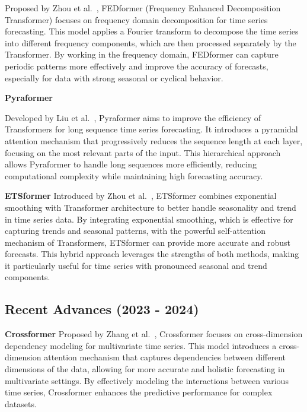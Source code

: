 \noindent Proposed by Zhou et al.~\cite{zhou2022fedformerfrequencyenhanceddecomposed}, FEDformer (Frequency Enhanced Decomposition Transformer) focuses on frequency domain decomposition for time series forecasting. This model applies a Fourier transform to decompose the time series into different frequency components, which are then processed separately by the Transformer. By working in the frequency domain, FEDformer can capture periodic patterns more effectively and improve the accuracy of forecasts, especially for data with strong seasonal or cyclical behavior.
\vspace{10pt}


\noindent\textbf
{Pyraformer}

\noindent Developed by Liu et al.~\cite{liu2022pyraformer}, Pyraformer aims to improve the efficiency of Transformers for long sequence time series forecasting. It introduces a pyramidal attention mechanism that progressively reduces the sequence length at each layer, focusing on the most relevant parts of the input. This hierarchical approach allows Pyraformer to handle long sequences more efficiently, reducing computational complexity while maintaining high forecasting accuracy.
\vspace{10pt}


\noindent\textbf
{ETSformer}
 Introduced by Zhou et al.~\cite{woo2022etsformerexponentialsmoothingtransformers}, ETSformer combines exponential smoothing with Transformer architecture to better handle seasonality and trend in time series data. By integrating exponential smoothing, which is effective for capturing trends and seasonal patterns, with the powerful self-attention mechanism of Transformers, ETSformer can provide more accurate and robust forecasts. This hybrid approach leverages the strengths of both methods, making it particularly useful for time series with pronounced seasonal and trend components.
\vspace{10pt}


\subsection{Recent Advances (2023 - 2024)}
\noindent\textbf
{Crossformer}
 Proposed by Zhang et al.~\cite{wang2021crossformerversatilevisiontransformer}, Crossformer focuses on cross-dimension dependency modeling for multivariate time series. This model introduces a cross-dimension attention mechanism that captures dependencies between different dimensions of the data, allowing for more accurate and holistic forecasting in multivariate settings. By effectively modeling the interactions between various time series, Crossformer enhances the predictive performance for complex datasets.
\vspace{10pt}


